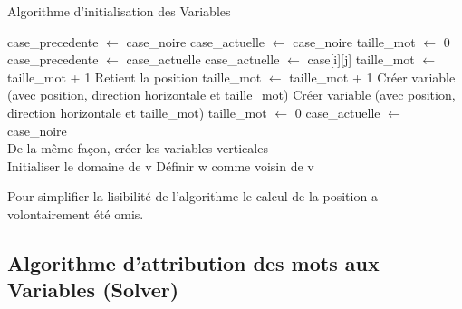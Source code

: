\documentclass [ 11 pt ] {article}
\begin{document}
    \begin{algorithm}[H]
    \caption{Algorithme d'initialisation des Variables}\label{alg:cap}
    \begin{algorithmic}
    \State case\_precedente $\gets$ case\_noire
    \State case\_actuelle $\gets$ case\_noire
    \State taille\_mot $\gets$ 0 \\
            \State case\_precedente $\gets$ case\_actuelle
            \State case\_actuelle $\gets$ case[i][j]
                \State taille\_mot $\gets$ taille\_mot + 1
                \State Retient la position
            \EndIf
                \State taille\_mot $\gets$ taille\_mot + 1
            \EndIf
                    \State Créer variable (avec  position, direction horizontale et taille\_mot)
                \EndIf
            \EndIf
        \EndFor
                \State Créer variable (avec  position, direction horizontale et taille\_mot)
        \EndIf
        \State taille\_mot $\gets$ 0   
        \State case\_actuelle $\gets$ case\_noire    
    \EndFor \\
        \State De la même façon, créer les variables verticales
        \EndFor
    \EndFor \\
    
        \State Initialiser le domaine de v 
            \State Définir w comme voisin de v 
        \EndFor
    \EndFor
    \end{algorithmic}
    \end{algorithm}
    
    Pour simplifier la lisibilité de l'algorithme le calcul de la position a volontairement été omis. 
    
        \newpage

    \subsection{Algorithme d'attribution des mots aux Variables (Solver) }
    
\end{document}
